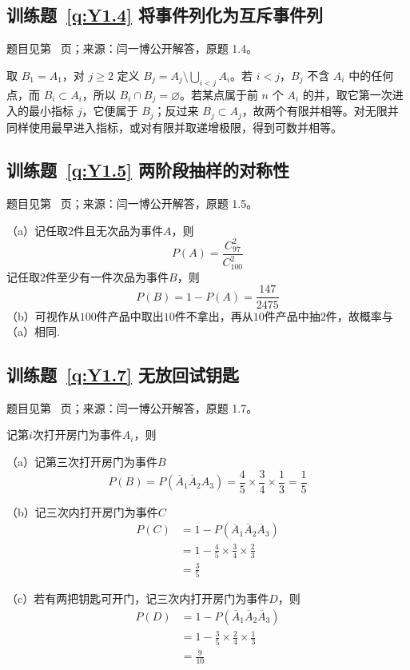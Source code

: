 \subsection*{训练题~\ref{q:Y1.4} 将事件列化为互斥事件列}\label{a:Y1.4}{\small 题目见第~\pageref{q:Y1.4} 页；来源：闫一博公开解答，原题 1.4。}
\begin{solve}取 $B_1=A_1$，对 $j\ge2$ 定义 $B_j=A_j\setminus\bigcup_{i<j}A_i$。若 $i<j$，$B_j$ 不含 $A_i$ 中的任何点，而 $B_i\subset A_i$，所以 $B_i\cap B_j=\varnothing$。若某点属于前 $n$ 个 $A_i$ 的并，取它第一次进入的最小指标 $j$，它便属于 $B_j$；反过来 $B_j\subset A_j$，故两个有限并相等。对无限并同样使用最早进入指标，或对有限并取递增极限，得到可数并相等。\end{solve}

\subsection*{训练题~\ref{q:Y1.5} 两阶段抽样的对称性}\label{a:Y1.5}{\small 题目见第~\pageref{q:Y1.5} 页；来源：闫一博公开解答，原题 1.5。}
\begin{solve}
（a）记任取$2$件且无次品为事件$A$，则
\[P(A) = \frac{{C_{97}^2}}{{C_{100}^2}} \]
记任取$2$件至少有一件次品为事件$B$，则
\[
P(B)=1-P(A)=\frac{147}{2475}
\]
（b）可视作从$100$件产品中取出$10$件不拿出，再从$10$件产品中抽$2$件，故概率与（a）相同.
\end{solve}

\subsection*{训练题~\ref{q:Y1.7} 无放回试钥匙}\label{a:Y1.7}{\small 题目见第~\pageref{q:Y1.7} 页；来源：闫一博公开解答，原题 1.7。}
\begin{solve}
记第$i$次打开房门为事件$A_i$，则

（a）记第三次打开房门为事件$B$
\[P(B)=P({\overline A _1}{\overline A _2}{A_3}) = \frac{4}{5} \times \frac{3}{4} \times \frac{1}{3} = \frac{1}{5}\]

（b）记三次内打开房门为事件$C$
\[\begin{aligned}P(C) &= 1 - P({\overline A _1}{\overline A _2}{\overline A _3}) \\&= 1 - \frac{4}{5} \times \frac{3}{4} \times \frac{2}{3} \\&= \frac{3}{5}\end{aligned}\]

（c）若有两把钥匙可开门，记三次内打开房门为事件$D$，则
\[\begin{aligned}P(D) &= 1 - P({\overline A _1}{\overline A _2}{\overline A _3}) \\&= 1 - \frac{3}{5} \times \frac{2}{4} \times \frac{1}{3} \\&= \frac{9}{{10}}\end{aligned}\]
\end{solve}

